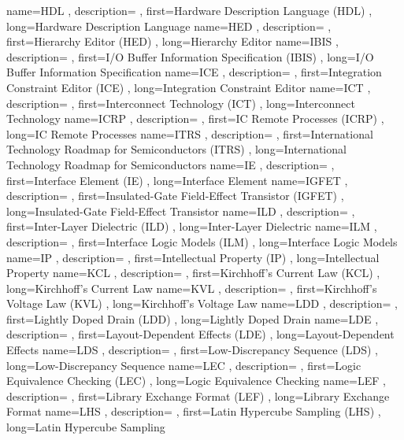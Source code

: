 { name={HDL}
, description={}
, first={Hardware Description Language (HDL)}
, long={Hardware Description Language}
}
{ name={HED}
, description={}
, first={Hierarchy Editor (HED)}
, long={Hierarchy Editor}
}
{ name={IBIS}
, description={}
, first={I/O Buffer Information Specification (IBIS)}
, long={I/O Buffer Information Specification}
}
{ name={ICE}
, description={}
, first={Integration Constraint Editor (ICE)}
, long={Integration Constraint Editor}
}
{ name={ICT}
, description={}
, first={Interconnect Technology (ICT)}
, long={Interconnect Technology}
}
{ name={ICRP}
, description={}
, first={IC Remote Processes (ICRP)}
, long={IC Remote Processes}
}
{ name={ITRS}
, description={}
, first={International Technology Roadmap for Semiconductors (ITRS)}
, long={International Technology Roadmap for Semiconductors}
}
{ name={IE}
, description={}
, first={Interface Element (IE)}
, long={Interface Element}
}
{ name={IGFET}
, description={}
, first={Insulated-Gate Field-Effect Transistor (IGFET)}
, long={Insulated-Gate Field-Effect Transistor}
}
{ name={ILD}
, description={}
, first={Inter-Layer Dielectric (ILD)}
, long={Inter-Layer Dielectric}
}
{ name={ILM}
, description={}
, first={Interface Logic Models (ILM)}
, long={Interface Logic Models}
}
{ name={IP}
, description={}
, first={Intellectual Property (IP)}
, long={Intellectual Property}
}
{ name={KCL}
, description={}
, first={Kirchhoff’s Current Law (KCL)}
, long={Kirchhoff’s Current Law}
}
{ name={KVL}
, description={}
, first={Kirchhoff’s Voltage Law (KVL)}
, long={Kirchhoff’s Voltage Law}
}
{ name={LDD}
, description={}
, first={Lightly Doped Drain (LDD)}
, long={Lightly Doped Drain}
}
{ name={LDE}
, description={}
, first={Layout-Dependent Effects (LDE)}
, long={Layout-Dependent Effects}
}
{ name={LDS}
, description={}
, first={Low-Discrepancy Sequence (LDS)}
, long={Low-Discrepancy Sequence}
}
{ name={LEC}
, description={}
, first={Logic Equivalence Checking (LEC)}
, long={Logic Equivalence Checking}
}
{ name={LEF}
, description={}
, first={Library Exchange Format (LEF)}
, long={Library Exchange Format}
}
{ name={LHS}
, description={}
, first={Latin Hypercube Sampling (LHS)}
, long={Latin Hypercube Sampling}
}
